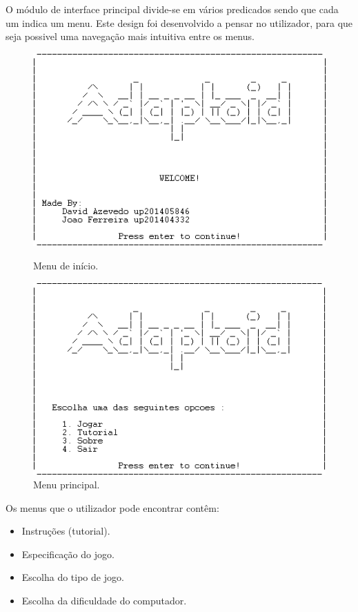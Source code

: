\documentclass[a4paper]{article}
\begin{document}
O módulo de interface principal divide-se em vários predicados sendo que cada um indica um menu. Este design foi desenvolvido a pensar no utilizador, para que seja possivel uma navegação mais intuitiva entre os menus.
\begin{figure}[h]
    \begin{minipage}[b]{0.4\textwidth}
        \includegraphics[scale=0.5]{menuPrincipal}
        \caption{Menu de início.}
    \end{minipage}
    \begin{minipage}[b]{0.4\textwidth}
        \includegraphics[scale=0.5]{menuEscolha}
        \caption{Menu principal.}
    \end{minipage}
\end{figure}


Os menus que o utilizador pode encontrar contêm:

\begin{itemize}
	\item Instruções (tutorial).
	\item Especificação do jogo.
	\item Escolha do tipo de jogo.
	\item Escolha da dificuldade do computador.
\end{itemize}
\end{document}
